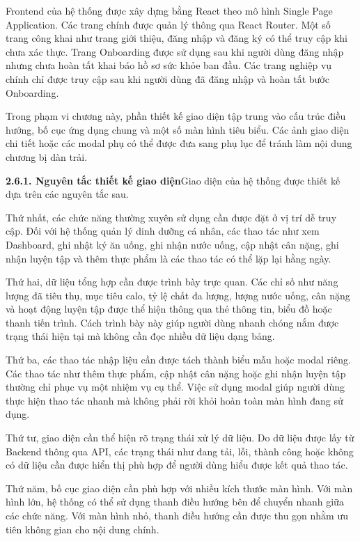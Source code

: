 Frontend của hệ thống được xây dựng bằng React theo mô hình Single Page Application. Các trang chính được quản lý thông qua React Router. Một số trang công khai như trang giới thiệu, đăng nhập và đăng ký có thể truy cập khi chưa xác thực. Trang Onboarding được sử dụng sau khi người dùng đăng nhập nhưng chưa hoàn tất khai báo hồ sơ sức khỏe ban đầu. Các trang nghiệp vụ chính chỉ được truy cập sau khi người dùng đã đăng nhập và hoàn tất bước Onboarding.

Trong phạm vi chương này, phần thiết kế giao diện tập trung vào cấu trúc điều hướng, bố cục ứng dụng chung và một số màn hình tiêu biểu. Các ảnh giao diện chi tiết hoặc các modal phụ có thể được đưa sang phụ lục để tránh làm nội dung chương bị dàn trải.

\textbf{2.6.1. Nguyên tắc thiết kế giao diện}Giao diện của hệ thống được thiết kế dựa trên các nguyên tắc sau.

Thứ nhất, các chức năng thường xuyên sử dụng cần được đặt ở vị trí dễ truy cập. Đối với hệ thống quản lý dinh dưỡng cá nhân, các thao tác như xem Dashboard, ghi nhật ký ăn uống, ghi nhận nước uống, cập nhật cân nặng, ghi nhận luyện tập và thêm thực phẩm là các thao tác có thể lặp lại hằng ngày.

Thứ hai, dữ liệu tổng hợp cần được trình bày trực quan. Các chỉ số như năng lượng đã tiêu thụ, mục tiêu calo, tỷ lệ chất đa lượng, lượng nước uống, cân nặng và hoạt động luyện tập được thể hiện thông qua thẻ thông tin, biểu đồ hoặc thanh tiến trình. Cách trình bày này giúp người dùng nhanh chóng nắm được trạng thái hiện tại mà không cần đọc nhiều dữ liệu dạng bảng.

Thứ ba, các thao tác nhập liệu cần được tách thành biểu mẫu hoặc modal riêng. Các thao tác như thêm thực phẩm, cập nhật cân nặng hoặc ghi nhận luyện tập thường chỉ phục vụ một nhiệm vụ cụ thể. Việc sử dụng modal giúp người dùng thực hiện thao tác nhanh mà không phải rời khỏi hoàn toàn màn hình đang sử dụng.

Thứ tư, giao diện cần thể hiện rõ trạng thái xử lý dữ liệu. Do dữ liệu được lấy từ Backend thông qua API, các trạng thái như đang tải, lỗi, thành công hoặc không có dữ liệu cần được hiển thị phù hợp để người dùng hiểu được kết quả thao tác.

Thứ năm, bố cục giao diện cần phù hợp với nhiều kích thước màn hình. Với màn hình lớn, hệ thống có thể sử dụng thanh điều hướng bên để chuyển nhanh giữa các chức năng. Với màn hình nhỏ, thanh điều hướng cần được thu gọn nhằm ưu tiên không gian cho nội dung chính.

